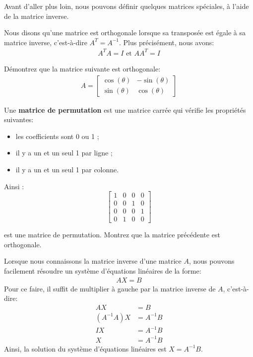 \documentclass[]{book}
\providecommand{\tightlist}{%
  \setlength{\itemsep}{0pt}\setlength{\parskip}{0pt}}
\theoremstyle{definition}
\theoremstyle{definition}
\theoremstyle{definition}
\theoremstyle{remark}
\let\BeginKnitrBlock\begin \let\EndKnitrBlock\end
\begin{document}
Avant d'aller plus loin, nous pouvons définir quelques matrices spéciales, à l'aide de la matrice inverse.

\BeginKnitrBlock{definition}[La matrice orthogonale]
\protect\hypertarget{def:unnamed-chunk-79}{}{\label{def:unnamed-chunk-79} {} }Nous disons qu'une matrice est orthogonale lorsque sa transposée est égale à sa matrice inverse, c'est-à-dire \(A^T=A^{-1}\). Plus précisément, nous avons:
\begin{align*}
A^TA=I \text{ et } AA^T=I
\end{align*}
\EndKnitrBlock{definition}

\BeginKnitrBlock{example}
\protect\hypertarget{exm:unnamed-chunk-80}{}{\label{exm:unnamed-chunk-80} }Démontrez que la matrice suivante est orthogonale:
\begin{align*}
A=\begin{bmatrix}
\cos(\theta) & -\sin(\theta) \\
\sin(\theta) & \cos(\theta)
\end{bmatrix}
\end{align*}
\EndKnitrBlock{example}

\BeginKnitrBlock{example}
\protect\hypertarget{exm:unnamed-chunk-81}{}{\label{exm:unnamed-chunk-81} }Une \textbf{matrice de permutation} est une matrice carrée qui vérifie les propriétés suivantes:

\begin{itemize}
\tightlist
\item
  les coefficients sont 0 ou 1 ;
\item
  il y a un et un seul 1 par ligne ;
\item
  il y a un et un seul 1 par colonne.
\end{itemize}

Ainsi :
\[\begin{bmatrix}
1 & 0 & 0 & 0\\
0 & 0 & 1 & 0\\
0 & 0 & 0 & 1\\
0 & 1 & 0 & 0\end{bmatrix}\]

est une matrice de permutation. Montrez que la matrice précédente est orthogonale.
\EndKnitrBlock{example}

Lorsque nous connaissons la matrice inverse d'une matrice \(A\), nous pouvons facilement résoudre un système d'équations linéaires de la forme:
\begin{align*}
AX=B 
\end{align*}
Pour ce faire, il suffit de multiplier à gauche par la matrice inverse de \(A\), c'est-à-dire:
\begin{align*}
AX&=B\\
(A^{-1}A)X&=A^{-1}B\\
IX&=A^{-1}B\\
X&=A^{-1}B
\end{align*}
Ainsi, la solution du système d'équations linéaires est \(X=A^{-1}B\).
\end{document}
